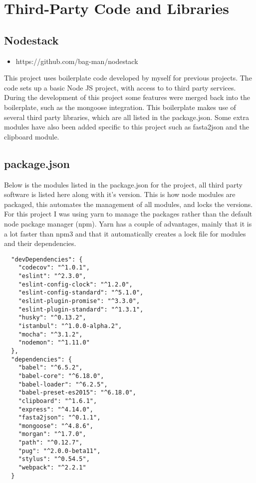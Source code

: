 \chapter{Third-Party Code and Libraries}
\section{Nodestack}
\begin{itemize}
  \item https://github.com/bag-man/nodestack
\end{itemize}
This project uses boilerplate code developed by myself for previous projects. The code sets up a basic Node JS project, with access to to third party services. During the development of this project some features were merged back into the boilerplate, such as the mongoose integration.  This boilerplate makes use of several third party libraries, which are all listed in the package.json. Some extra modules have also been added specific to this project such as fasta2json and the clipboard module. 


\section{package.json}
Below is the modules listed in the package.json for the project, all third party software is listed here along with it's version. This is how node modules are packaged, this automates the management of all modules, and locks the versions. For this project I was using yarn\cite{yarn} to manage the packages rather than the default node package manager (npm)\cite{npm}. Yarn has a couple of advantages, mainly that it is a lot faster than npm3 and that it automatically creates a lock file for modules and their dependencies. 

\begin{lstlisting}
  "devDependencies": {
    "codecov": "^1.0.1",
    "eslint": "^2.3.0",
    "eslint-config-clock": "^1.2.0",
    "eslint-config-standard": "^5.1.0",
    "eslint-plugin-promise": "^3.3.0",
    "eslint-plugin-standard": "^1.3.1",
    "husky": "^0.13.2",
    "istanbul": "^1.0.0-alpha.2",
    "mocha": "^3.1.2",
    "nodemon": "^1.11.0"
  },
  "dependencies": {
    "babel": "^6.5.2",
    "babel-core": "^6.18.0",
    "babel-loader": "^6.2.5",
    "babel-preset-es2015": "^6.18.0",
    "clipboard": "^1.6.1",
    "express": "^4.14.0",
    "fasta2json": "^0.1.1",
    "mongoose": "^4.8.6",
    "morgan": "^1.7.0",
    "path": "^0.12.7",
    "pug": "^2.0.0-beta11",
    "stylus": "^0.54.5",
    "webpack": "^2.2.1"
  }
\end{lstlisting}

